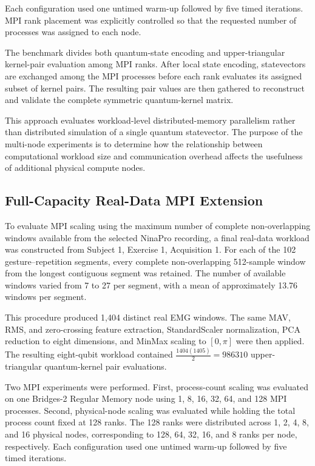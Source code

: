 \documentclass[pdflatex,sn-mathphys-num]{sn-jnl}%
\theoremstyle{thmstyleone}%
\theoremstyle{thmstyletwo}%
\theoremstyle{thmstylethree}%
\begin{document}
Each configuration used one untimed warm-up followed by five timed iterations.
MPI rank placement was explicitly controlled so that the requested number of
processes was assigned to each node.

The benchmark divides both quantum-state encoding and upper-triangular
kernel-pair evaluation among MPI ranks. After local state encoding,
statevectors are exchanged among the MPI processes before each rank evaluates
its assigned subset of kernel pairs. The resulting pair values are then
gathered to reconstruct and validate the complete symmetric quantum-kernel
matrix.

This approach evaluates workload-level distributed-memory parallelism rather
than distributed simulation of a single quantum statevector. The purpose of
the multi-node experiments is to determine how the relationship between
computational workload size and communication overhead affects the usefulness
of additional physical compute nodes.

\subsection{Full-Capacity Real-Data MPI Extension}
\label{subsec:fullcapacity-mpi-method}

To evaluate MPI scaling using the maximum number of complete non-overlapping
windows available from the selected NinaPro recording, a final real-data
workload was constructed from Subject 1, Exercise 1, Acquisition 1. For each
of the 102 gesture--repetition segments, every complete non-overlapping
512-sample window from the longest contiguous segment was retained. The number
of available windows varied from 7 to 27 per segment, with a mean of
approximately 13.76 windows per segment.

This procedure produced 1,404 distinct real EMG windows. The same MAV, RMS,
and zero-crossing feature extraction, StandardScaler normalization, PCA
reduction to eight dimensions, and MinMax scaling to $[0,\pi]$ were then
applied. The resulting eight-qubit workload contained \(\frac{1404(1405)}{2} = 986310\) upper-triangular quantum-kernel pair evaluations.

Two MPI experiments were performed. First, process-count scaling was evaluated
on one Bridges-2 Regular Memory node using 1, 8, 16, 32, 64, and 128 MPI
processes. Second, physical-node scaling was evaluated while holding the total
process count fixed at 128 ranks. The 128 ranks were distributed across 1, 2,
4, 8, and 16 physical nodes, corresponding to 128, 64, 32, 16, and 8 ranks
per node, respectively. Each configuration used one untimed warm-up followed
by five timed iterations.
\end{document}
